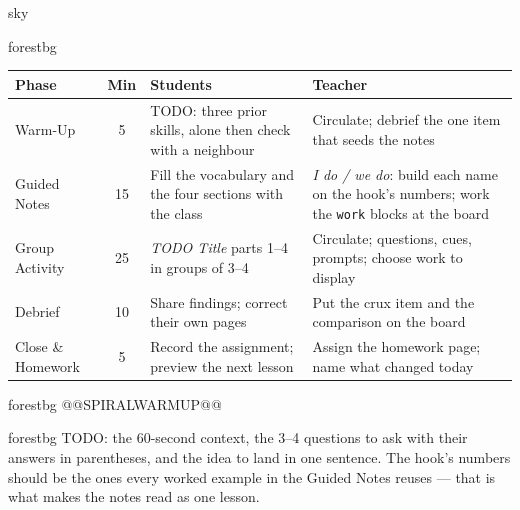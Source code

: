 \documentclass[10pt]{article}
\begin{document}
\begin{skillbox}{sky}
\end{skillbox}

\begin{fixedskillbox}{forestbg}
\renewcommand{\arraystretch}{1.25}
\begin{tabularx}{\linewidth}{@{}l c X X@{}}
\textbf{Phase} & \textbf{Min} & \textbf{Students} & \textbf{Teacher} \\
\hline
Warm-Up & 5 & TODO: three prior skills, alone then check with a neighbour & Circulate; debrief the one item that seeds the notes \\
Guided Notes & 15 & Fill the vocabulary and the four sections with the class & \emph{I do / we do}: build each name on the hook's numbers; work the \texttt{work} blocks at the board \\
Group Activity & 25 & \emph{TODO Title} parts 1--4 in groups of 3--4 & Circulate; questions, cues, prompts; choose work to display \\
Debrief & 10 & Share findings; correct their own pages & Put the crux item and the comparison on the board \\
Close \& Homework & 5 & Record the assignment; preview the next lesson & Assign the homework page; name what changed today \\
\end{tabularx}
\end{fixedskillbox}

\begin{fixedskillbox}{forestbg}
@@SPIRALWARMUP@@
\end{fixedskillbox}

\begin{skillbox}[Hook]{forestbg}
    TODO: the 60-second context, the 3--4 questions to ask with their answers in parentheses, and
    the idea to land in one sentence. The hook's numbers should be the ones every worked example in
    the Guided Notes reuses --- that is what makes the notes read as one lesson.
\end{skillbox}
\end{document}
